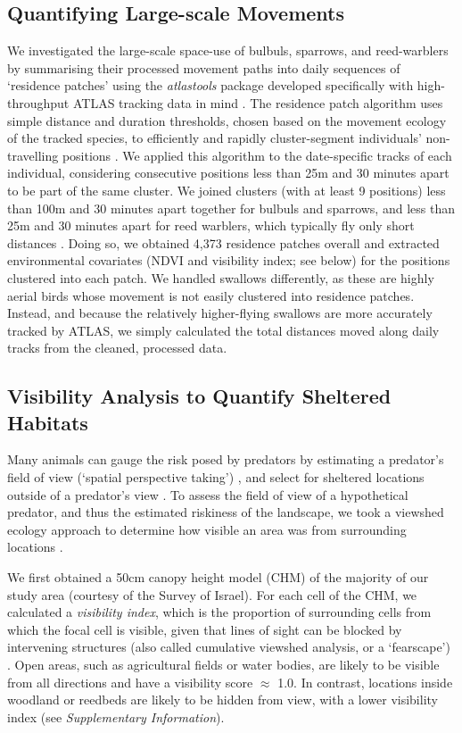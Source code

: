 \subsection*{Quantifying Large-scale Movements}

We investigated the large-scale space-use of bulbuls, sparrows, and reed-warblers by summarising their processed movement paths into daily sequences of `residence patches' using the \textit{atlastools} package developed specifically with high-throughput ATLAS tracking data in mind \citep{gupte2022d}.
The residence patch algorithm uses simple distance and duration thresholds, chosen based on the movement ecology of the tracked species, to efficiently and rapidly cluster-segment individuals' non-travelling positions \citep{gupte2022d}.
We applied this algorithm to the date-specific tracks of each individual, considering consecutive positions less than 25m and 30 minutes apart to be part of the same cluster.
We joined clusters (with at least 9 positions) less than 100m and 30 minutes apart together for bulbuls and sparrows, and less than 25m and 30 minutes apart for reed warblers, which typically fly only short distances \cite{kiat2016}.
Doing so, we obtained 4,373 residence patches overall and extracted environmental covariates (NDVI and visibility index; see below) for the positions clustered into each patch.
We handled swallows differently, as these are highly aerial birds whose movement is not easily clustered into residence patches.
Instead, and because the relatively higher-flying swallows are more accurately tracked by ATLAS, we simply calculated the total distances moved along daily tracks from the cleaned, processed data.

\subsection*{Visibility Analysis to Quantify Sheltered Habitats}

Many animals can gauge the risk posed by predators by estimating a predator's field of view (`spatial perspective taking') \cite{emery2000,bruce2003,davidson2016}, and select for sheltered locations outside of a predator's view \citep{hampton1994,krams2001,watve2002}.
To assess the field of view of a hypothetical predator, and thus the estimated riskiness of the landscape, we took a viewshed ecology approach to determine how visible an area was from surrounding locations \citep{aben2018,aben2021}.

We first obtained a 50cm canopy height model (CHM) \citep{aben2021} of the majority of our study area (courtesy of the Survey of Israel).
For each cell of the CHM, we calculated a \textit{visibility index}, which is the proportion of surrounding cells from which the focal cell is visible, given that lines of sight can be blocked by intervening structures (also called cumulative viewshed analysis, or a `fearscape') \cite{olsoy2015}.
Open areas, such as agricultural fields or water bodies, are likely to be visible from all directions and have a visibility score $\approx$ 1.0.
In contrast, locations inside woodland or reedbeds are likely to be hidden from view, with a lower visibility index (see \textit{Supplementary Information}).

